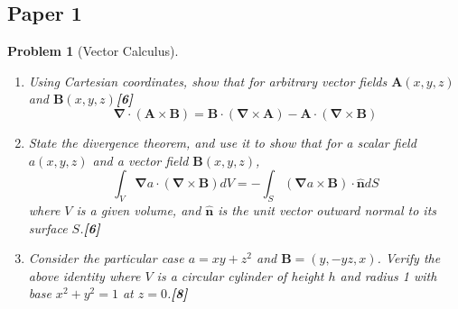 \documentclass[a4paper]{article}
\theoremstyle{new}
\newtheorem{qns}{Problem}[section]
\begin{document}
\subsection{Paper 1}
\begin{qns}[Vector Calculus]\leavevmode
\begin{enumerate}[label=(\roman*)]
    \item Using Cartesian coordinates, show that for arbitrary vector fields $\mathbf{A}(x,y,z)$ and $\mathbf{B}(x,y,z)$\hfill \textbf{[6]}
$$\boldsymbol{\nabla}\cdot(\mathbf{A}\times\mathbf{B})=\mathbf{B}\cdot(\boldsymbol{\nabla}\times\mathbf{A})-\mathbf{A}\cdot(\boldsymbol{\nabla}\times\mathbf{B})$$
\item State the divergence theorem, and use it to show that for a scalar field $a(x,y,z)$ and a vector field $\mathbf{B}(x,y,z)$,
\begin{equation}
  \int_V\boldsymbol{\nabla}a\cdot(\boldsymbol{\nabla}\times\mathbf{B})dV=-\int_S(\boldsymbol{\nabla}a\times\mathbf{B})\cdot\mathbf{\hat{n}}dS\tag{*}  
\end{equation}
where $V$ is a given volume, and $\mathbf{\hat{n}}$ is the unit vector outward normal to its surface $S$.\hfill \textbf{[6]}
\item  Consider the particular case $a=xy+z^2$ and $\mathbf{B}=(y,-yz,x)$. Verify the above identity where $V$ is a circular cylinder of height $h$ and radius 1 with base $x^2+y^2=1$ at $z=0$.\hfill \textbf{[8]}
\end{enumerate}
\end{qns}
\end{document}
